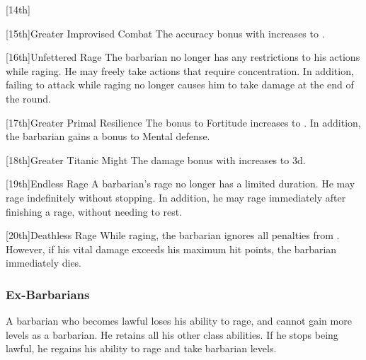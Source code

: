         [14th]{}

        [15th]{Greater Improvised Combat}
        The accuracy bonus with  increases to .

        [16th]{Unfettered Rage}
        The barbarian no longer has any restrictions to his actions while raging.
        He may freely take actions that require concentration.
        In addition, failing to attack while raging no longer causes him to take damage at the end of the round.

        [17th]{Greater Primal Resilience}
        The bonus to Fortitude increases to .
        In addition, the barbarian gains a  bonus to Mental defense.

        [18th]{Greater Titanic Might}
        The damage bonus with  increases to \plus3d.

        [19th]{Endless Rage}
        A barbarian's rage no longer has a limited duration.
        He may rage indefinitely without stopping.
        In addition, he may rage immediately after finishing a rage, without needing to rest.

        [20th]{Deathless Rage}
        While raging, the barbarian ignores all penalties from .
        However, if his vital damage exceeds his maximum hit points, the barbarian immediately dies.

        \subsubsection{Ex-Barbarians}
            A barbarian who becomes lawful loses his ability to rage, and cannot gain more levels as a barbarian.
            He retains all his other class abilities.
            If he stops being lawful, he regains his ability to rage and take barbarian levels.

